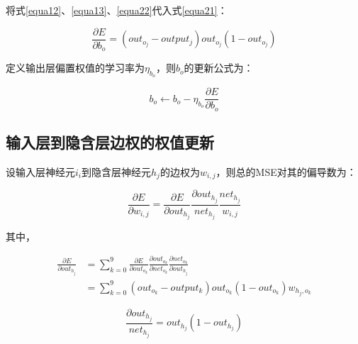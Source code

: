 \documentclass[forprint]{WHUBachelor}
\begin{document}
         将式\ref{equa12}、\ref{equa13}、\ref{equa22}代入式\ref{equa21}：
         
         \begin{equation}
           \frac{\partial{E}}{\partial{b_o}}=
           (out_{o_j}-output_j)out_{o_j}(1-out_{o_j})
         \end{equation}
   
         定义输出层偏置权值的学习率为$\eta_{b_o}$，则$b_o$的更新公式为：
   
         \begin{equation}
           b_o\gets b_o-\eta_{b_o}\frac{\partial{E}}{\partial{b_o}}
         \end{equation}
   
       \subsection{输入层到隐含层边权的权值更新}
   
         设输入层神经元$i_i$到隐含层神经元$h_j$的边权为$w_{i,j}$，则总的MSE对其的偏导数为：
   
         \begin{equation}
           \frac{\partial E}{\partial w_{i,j}}=
           \frac{\partial E}{\partial out_{h_j}}
           \frac{\partial out_{h_j}}{net_{h_j}}
           \frac{net_{h_j}}{w_{i,j}}
           \label{equa31}
         \end{equation}
   
         其中，
         
         \begin{equation}
           \begin{split}
           \frac{\partial E}{\partial out_{h_j}}&=
           \sum_{k=0}^9 \frac{\partial E}{\partial out_{o_k}}
           \frac{\partial out_{o_k}}{\partial net_{o_k}}
           \frac{\partial net_{o_k}}{\partial out_{h_j}} 
           \\
           &=
           \sum_{k=0}^9
           (out_{o_k}-output_k)
           out_{o_k}(1-out_{o_k})
           w_{h_j,o_k}
           \end{split}
           \label{equa32}
         \end{equation}
   
         \begin{equation}
           \frac{\partial out_{h_j}}{net_{h_j}}=
           out_{h_j}(1-out_{h_j})
           \label{equa33}
         \end{equation}
   
\end{document}
